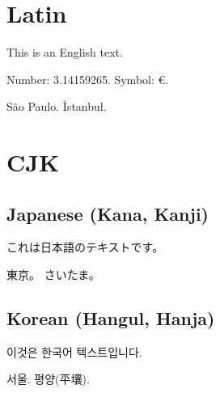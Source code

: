 \documentclass[a4paper]{article}
\begin{document}
\thispagestyle{empty}
\section{Latin}
This is an English text.


Number: 3.14159265.
Symbol: €.

São Paulo.
İstanbul.

\section{CJK}
\subsection{Japanese (Kana, Kanji)}
\begin{japanese}
これは日本語のテキストです。


東京。
さいたま。
\end{japanese}

\subsection{Korean (Hangul, Hanja)}
\begin{korean}
이것은 한국어 텍스트입니다.

서울.
평양(平壤).
\end{korean}
\end{document}
